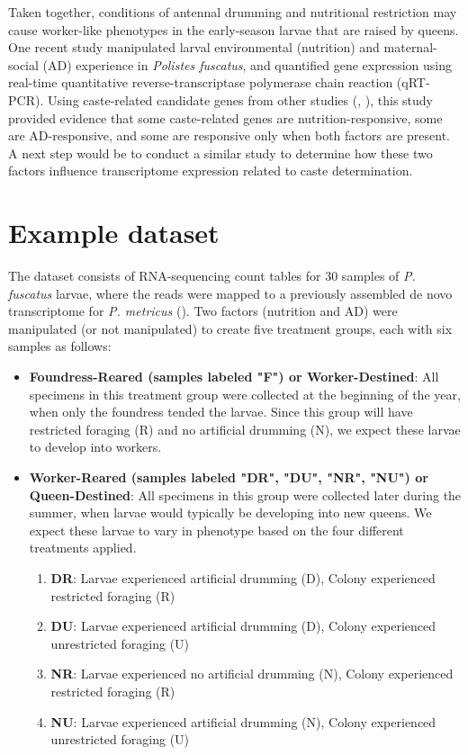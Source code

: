 \documentclass[11pt,a4paper,oldfontcommands,openany]{memoir}
\numberwithin{equation}{section} %
\begin{document}
Taken together, conditions of antennal drumming and nutritional restriction may cause worker-like phenotypes in the early-season larvae that are raised by queens. One recent study manipulated larval environmental (nutrition) and maternal-social (AD) experience in \textit{Polistes fuscatus}, and quantified gene expression using real-time quantitative reverse-transcriptase polymerase chain reaction (qRT-PCR). Using caste-related candidate genes from other studies (\citealt{pw17}, \citealt{pw18}), this study provided evidence that some caste-related genes are nutrition-responsive, some are AD-responsive, and some are responsive only when both factors are present. A next step would be to conduct a similar study to determine how these two factors influence transcriptome expression related to caste determination.

\section{Example dataset}

The dataset consists of RNA-sequencing count tables for 30 samples of \textit{P. fuscatus} larvae, where the reads were mapped to a previously assembled de novo transcriptome for \textit{P. metricus} (\citealt{pw19}). Two factors (nutrition and AD) were manipulated (or not manipulated) to create five treatment groups, each with six samples as follows:

\begin{itemize}
\item \textbf{Foundress-Reared (samples labeled "F") or Worker-Destined}: 
All specimens in this treatment group were collected at the beginning of the year, when only the foundress tended the larvae. Since this group will have restricted foraging (R) and no artificial drumming (N), we expect these larvae to develop into workers.
\item \textbf{Worker-Reared (samples labeled "DR", "DU", "NR", "NU") or Queen-Destined}:
All specimens in this group were collected later during the summer, when larvae would typically be developing into new queens. We expect these larvae to vary in phenotype based on the four different treatments applied.
\begin{enumerate}
\item \textbf{DR}: Larvae experienced artificial drumming (D), Colony experienced restricted foraging (R)
\item \textbf{DU}: Larvae experienced artificial drumming (D), Colony experienced unrestricted foraging (U)
\item \textbf{NR}: Larvae experienced no artificial drumming (N), Colony experienced restricted foraging (R)
\item \textbf{NU}: Larvae experienced artificial drumming (N), Colony experienced unrestricted foraging (U)
\end{enumerate}
\end{itemize}
\end{document}
